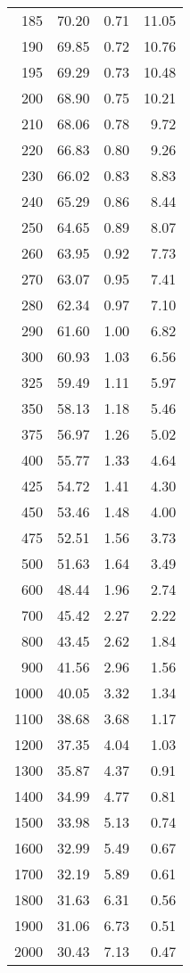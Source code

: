 \begin{table}[ht]
\begin{tabular}{rrrr}
   185 & 70.20 & 0.71 & 11.05 \\ 
   190 & 69.85 & 0.72 & 10.76 \\ 
   195 & 69.29 & 0.73 & 10.48 \\ 
   200 & 68.90 & 0.75 & 10.21 \\ 
   210 & 68.06 & 0.78 & 9.72 \\ 
   220 & 66.83 & 0.80 & 9.26 \\ 
   230 & 66.02 & 0.83 & 8.83 \\ 
   240 & 65.29 & 0.86 & 8.44 \\ 
   250 & 64.65 & 0.89 & 8.07 \\ 
   260 & 63.95 & 0.92 & 7.73 \\ 
   270 & 63.07 & 0.95 & 7.41 \\ 
   280 & 62.34 & 0.97 & 7.10 \\ 
   290 & 61.60 & 1.00 & 6.82 \\ 
   300 & 60.93 & 1.03 & 6.56 \\ 
   325 & 59.49 & 1.11 & 5.97 \\ 
   350 & 58.13 & 1.18 & 5.46 \\ 
   375 & 56.97 & 1.26 & 5.02 \\ 
   400 & 55.77 & 1.33 & 4.64 \\ 
   425 & 54.72 & 1.41 & 4.30 \\ 
   450 & 53.46 & 1.48 & 4.00 \\ 
   475 & 52.51 & 1.56 & 3.73 \\ 
   500 & 51.63 & 1.64 & 3.49 \\ 
   600 & 48.44 & 1.96 & 2.74 \\ 
   700 & 45.42 & 2.27 & 2.22 \\ 
   800 & 43.45 & 2.62 & 1.84 \\ 
   900 & 41.56 & 2.96 & 1.56 \\ 
  1000 & 40.05 & 3.32 & 1.34 \\ 
  1100 & 38.68 & 3.68 & 1.17 \\ 
  1200 & 37.35 & 4.04 & 1.03 \\ 
  1300 & 35.87 & 4.37 & 0.91 \\ 
  1400 & 34.99 & 4.77 & 0.81 \\ 
  1500 & 33.98 & 5.13 & 0.74 \\ 
  1600 & 32.99 & 5.49 & 0.67 \\ 
  1700 & 32.19 & 5.89 & 0.61 \\ 
  1800 & 31.63 & 6.31 & 0.56 \\ 
  1900 & 31.06 & 6.73 & 0.51 \\ 
  2000 & 30.43 & 7.13 & 0.47 \\ 
   \hline
\end{tabular}
\end{table}
